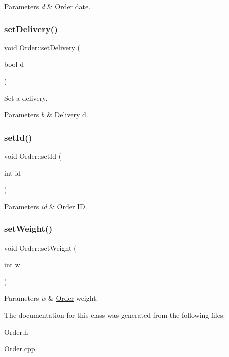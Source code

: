 \begin{DoxyParams}{Parameters}
{\em d} & \hyperlink{class_order}{Order} date. \\
\hline
\end{DoxyParams}
\mbox{\label{class_order_a2ceb0b81d58b2bdc506bc653d61b4104}} 
\subsubsection{\texorpdfstring{set\+Delivery()}{setDelivery()}}
{\footnotesize\ttfamily void Order\+::set\+Delivery (\begin{DoxyParamCaption}\item[{bool}]{d }\end{DoxyParamCaption})}



Set a delivery. 


\begin{DoxyParams}{Parameters}
{\em b} & Delivery d. \\
\hline
\end{DoxyParams}
\mbox{\label{class_order_ac2e6861304117b7f0170af983ec4ad14}} 
\subsubsection{\texorpdfstring{set\+Id()}{setId()}}
{\footnotesize\ttfamily void Order\+::set\+Id (\begin{DoxyParamCaption}\item[{int}]{id }\end{DoxyParamCaption})}


\begin{DoxyParams}{Parameters}
{\em id} & \hyperlink{class_order}{Order} ID. \\
\hline
\end{DoxyParams}
\mbox{\label{class_order_a519b7f621632b0e1ae0d556f0a95783e}} 
\subsubsection{\texorpdfstring{set\+Weight()}{setWeight()}}
{\footnotesize\ttfamily void Order\+::set\+Weight (\begin{DoxyParamCaption}\item[{int}]{w }\end{DoxyParamCaption})}


\begin{DoxyParams}{Parameters}
{\em w} & \hyperlink{class_order}{Order} weight. \\
\hline
\end{DoxyParams}


The documentation for this class was generated from the following files\+:\begin{DoxyCompactItemize}
\item 
Order.\+h\item 
Order.\+cpp\end{DoxyCompactItemize}
